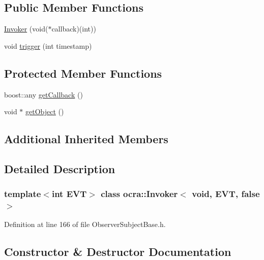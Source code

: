 \subsection*{Public Member Functions}
\begin{DoxyCompactItemize}
\item 
\hyperlink{classocra_1_1Invoker_3_01void_00_01EVT_00_01false_01_4_adbb4357c33d4e320a3a21916fd76fd80}{Invoker} (void($\ast$callback)(int))
\item 
void \hyperlink{classocra_1_1Invoker_3_01void_00_01EVT_00_01false_01_4_a483d45eb6e668e5c97b9861840f4d6ea}{trigger} (int timestamp)
\end{DoxyCompactItemize}
\subsection*{Protected Member Functions}
\begin{DoxyCompactItemize}
\item 
boost\+::any \hyperlink{classocra_1_1Invoker_3_01void_00_01EVT_00_01false_01_4_a28f6e1841ccdb09d1bfefbb529d51f79}{get\+Callback} ()
\item 
void $\ast$ \hyperlink{classocra_1_1Invoker_3_01void_00_01EVT_00_01false_01_4_a2d32f4dcaca9ae526b89e28cf2a3fc70}{get\+Object} ()
\end{DoxyCompactItemize}
\subsection*{Additional Inherited Members}


\subsection{Detailed Description}
\subsubsection*{template$<$int E\+VT$>$\newline
class ocra\+::\+Invoker$<$ void, E\+V\+T, false $>$}



Definition at line 166 of file Observer\+Subject\+Base.\+h.



\subsection{Constructor \& Destructor Documentation}
\hypertarget{classocra_1_1Invoker_3_01void_00_01EVT_00_01false_01_4_adbb4357c33d4e320a3a21916fd76fd80}{}\label{classocra_1_1Invoker_3_01void_00_01EVT_00_01false_01_4_adbb4357c33d4e320a3a21916fd76fd80} 
